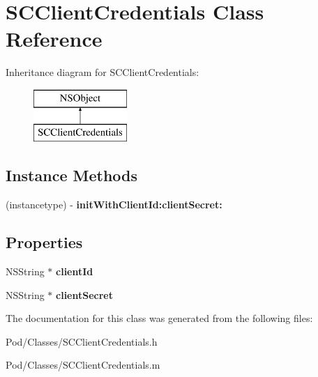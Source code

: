 \hypertarget{interface_s_c_client_credentials}{}\section{S\+C\+Client\+Credentials Class Reference}
\label{interface_s_c_client_credentials}
Inheritance diagram for S\+C\+Client\+Credentials\+:\begin{figure}[H]
\begin{center}
\leavevmode
\includegraphics[height=2.000000cm]{interface_s_c_client_credentials}
\end{center}
\end{figure}
\subsection*{Instance Methods}
\begin{DoxyCompactItemize}
\item 
(instancetype) -\/ {\bfseries init\+With\+Client\+Id\+:client\+Secret\+:}\hypertarget{interface_s_c_client_credentials_a92a4a549629f66e60d4d5c0e5bbec8eb}{}\label{interface_s_c_client_credentials_a92a4a549629f66e60d4d5c0e5bbec8eb}

\end{DoxyCompactItemize}
\subsection*{Properties}
\begin{DoxyCompactItemize}
\item 
N\+S\+String $\ast$ {\bfseries client\+Id}\hypertarget{interface_s_c_client_credentials_a029999cdabeacf41519011c22606a47a}{}\label{interface_s_c_client_credentials_a029999cdabeacf41519011c22606a47a}

\item 
N\+S\+String $\ast$ {\bfseries client\+Secret}\hypertarget{interface_s_c_client_credentials_abf38b22f565dcaec2bc622b89cafb3eb}{}\label{interface_s_c_client_credentials_abf38b22f565dcaec2bc622b89cafb3eb}

\end{DoxyCompactItemize}


The documentation for this class was generated from the following files\+:\begin{DoxyCompactItemize}
\item 
Pod/\+Classes/S\+C\+Client\+Credentials.\+h\item 
Pod/\+Classes/S\+C\+Client\+Credentials.\+m\end{DoxyCompactItemize}
